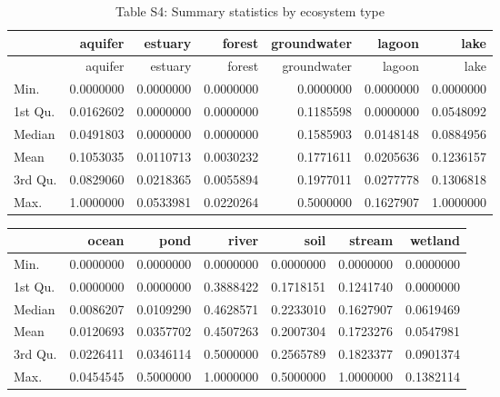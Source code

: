 \documentclass[
]{article}
\begin{document}
\captionsetup[table]{labelformat=empty}

\begin{longtable}[]{@{}lrrrrrr@{}}
\caption{Table S4: Summary statistics by ecosystem type}\tabularnewline
\toprule
& aquifer & estuary & forest & groundwater & lagoon &
lake\tabularnewline
\midrule
\endfirsthead
\toprule
& aquifer & estuary & forest & groundwater & lagoon &
lake\tabularnewline
\midrule
\endhead
Min. & 0.0000000 & 0.0000000 & 0.0000000 & 0.0000000 & 0.0000000 &
0.0000000\tabularnewline
1st Qu. & 0.0162602 & 0.0000000 & 0.0000000 & 0.1185598 & 0.0000000 &
0.0548092\tabularnewline
Median & 0.0491803 & 0.0000000 & 0.0000000 & 0.1585903 & 0.0148148 &
0.0884956\tabularnewline
Mean & 0.1053035 & 0.0110713 & 0.0030232 & 0.1771611 & 0.0205636 &
0.1236157\tabularnewline
3rd Qu. & 0.0829060 & 0.0218365 & 0.0055894 & 0.1977011 & 0.0277778 &
0.1306818\tabularnewline
Max. & 1.0000000 & 0.0533981 & 0.0220264 & 0.5000000 & 0.1627907 &
1.0000000\tabularnewline
\bottomrule
\end{longtable}

\begin{longtable}[]{@{}lrrrrrr@{}}
\toprule
& ocean & pond & river & soil & stream & wetland\tabularnewline
\midrule
\endhead
Min. & 0.0000000 & 0.0000000 & 0.0000000 & 0.0000000 & 0.0000000 &
0.0000000\tabularnewline
1st Qu. & 0.0000000 & 0.0000000 & 0.3888422 & 0.1718151 & 0.1241740 &
0.0000000\tabularnewline
Median & 0.0086207 & 0.0109290 & 0.4628571 & 0.2233010 & 0.1627907 &
0.0619469\tabularnewline
Mean & 0.0120693 & 0.0357702 & 0.4507263 & 0.2007304 & 0.1723276 &
0.0547981\tabularnewline
3rd Qu. & 0.0226411 & 0.0346114 & 0.5000000 & 0.2565789 & 0.1823377 &
0.0901374\tabularnewline
Max. & 0.0454545 & 0.5000000 & 1.0000000 & 0.5000000 & 1.0000000 &
0.1382114\tabularnewline
\bottomrule
\end{longtable}
\end{document}
